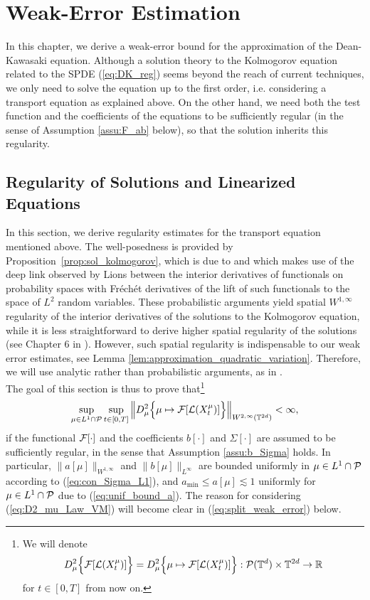 \section{Weak-Error Estimation}\label{sec:weak_error}

In this chapter, we derive a weak-error bound for the approximation of the Dean-Kawasaki equation. Although a solution theory to the Kolmogorov equation related to the SPDE (\ref{eq:DK_reg}) seems beyond the reach of current techniques, we only need to solve the equation up to the first order, i.e. considering a transport equation as explained above. On the other hand, we need both the test function and the coefficients of the equations to be sufficiently regular (in the sense of Assumption \ref{assu:F_ab} below), so that the solution inherits this regularity. 


\subsection{Regularity of Solutions and Linearized Equations}\label{sec:reg_KOL_lin}

In this section, we derive regularity estimates for the transport equation mentioned above. The well-posedness is provided by Proposition~\ref{prop:sol_kolmogorov}, which is due to \cite{BLPC17} and which makes use of the deep link observed by Lions \cite{L} between the interior derivatives of functionals on probability spaces with Fr\'ech\'et derivatives of the lift of such functionals to the space of $L^2$ random variables. These probabilistic arguments yield spatial $W^{1,\infty}$ regularity of the interior derivatives of the solutions to the Kolmogorov equation, while it is less straightforward to derive higher spatial regularity of the solutions (see Chapter 6 in \cite{BLPC17}). However, such spatial regularity is indispensable to our weak error estimates, see Lemma \ref{lem:approximation_quadratic_variation}. Therefore, we will use  analytic rather than probabilistic arguments, as in  \cite{T21,DT21}.\\

The goal of this section is thus to prove that\footnote{We will denote 
\[
D^2_{\mu}\Big\{\mathcal{F}[\mathcal{L}(X^{\mu}_{t})]\Big\} = D^2_{\mu}\Big\{\mu \mapsto \mathcal{F}[\mathcal{L}(X^{\mu}_{t})]\Big\}: \mathcal{P}(\mathbb{T}^d)\times \mathbb{T}^{2d} \to \mathbb{R}
\]
for $t \in [0,T]$ from now on. 
} 
\begin{equation}\label{eq:D2_mu_Law_VM}
\sup_{\mu \in L^1 \cap \mathcal{P}} \sup_{t \in [0,T]}\Big\|D^2_{\mu}\Big\{\mu \mapsto \mathcal{F}[\mathcal{L}(X^{\mu}_{t})]\Big\}\Big\|_{W^{2,\infty}(\mathbb{T}^{2d})} < \infty,
\end{equation}
if the functional $\mathcal{F}[\cdot]$ and the coefficients $b[\cdot]$ and $\Sigma[\cdot]$ are assumed to be sufficiently regular, in the sense that Assumption \ref{assu:b_Sigma} holds. In particular, $\|a[\mu]\|_{W^{1,\infty}}$ and $\|b[\mu]\|_{L^{\infty}}$ are bounded uniformly in $\mu \in L^1 \cap \mathcal{P}$ according to (\ref{eq:con_Sigma_L1}), and $a_{\min} \leq a[\mu] \lesssim 1$ uniformly for $\mu \in L^1 \cap \mathcal{P}$ due to (\ref{eq:unif_bound_a}). The reason for considering (\ref{eq:D2_mu_Law_VM}) will become clear in (\ref{eq:split_weak_error}) below. \\


